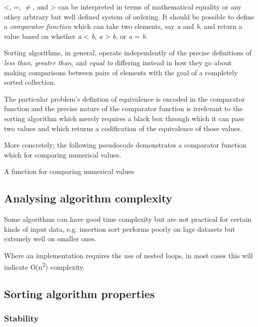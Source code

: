 \documentclass[12pt, a4paper]{article}
\begin{document}
<, =, $\ne$, and > can be interpreted in terms of mathematical equality or any othey arbtrary but well defined system of ordering. It should be possible to define a \emph{comparator function} which can take two elements, say \emph{a} and \emph{b}, and return a value based on whether \emph{a} < \emph{b}, \emph{a} > \emph{b}, or \emph{a} = \emph{b}.

Sorting algorithms, in general, operate independently of the precise definitions of \emph{less than}, \emph{greater than}, and \emph{equal to} differing instead in how they go about making comparisons between pairs of elements with the goal of a completely sorted collection.

The particular problem's defintion of equivalence is encoded in the comparator function and the precise nature of the comparator function is irrelevant to the sorting algorithm which merely requires a black box through which it can pass two values and which returns a codification of the equivalence of those values.

More concretely; the following pseudocode demonstrates a comparator function which for comparing numerical values.

\begin{algorithm}
\caption{A function for comparing numerical values}\label{euclid}
\begin{algorithmic}[1]
 
\EndIf
{} 
\EndIf
{} 
\EndIf
\EndProcedure
\end{algorithmic}
\end{algorithm}

\subsection{Analysing algorithm complexity}

Some algorithms can have good time complexity but are not practical for certain kinds of input data, e.g. insertion sort performs poorly on lage datasets but extemely well on smaller ones.

Where an implementation requires the use of nested loops, in most cases this will indicate O(n\textsuperscript{2}) complexity.

\subsection{Sorting algorithm properties}

\subsubsection{Stability}
\end{document}
